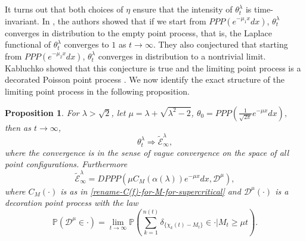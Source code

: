 \documentclass[a4paper,reqno]{amsart}%
\newcommand{\1}{\mathbf 1}
\theoremstyle{mine}
\numberwithin{theorem}{section}
\newtheorem{proposition}[theorem]{Proposition}
\numberwithin{equation}{section}
\theoremstyle{remark}
\begin{document}
It turns out that both choices of $\eta$ ensure that the intensity of $\theta^\lambda_t$ is time-invariant.
 In \cite{Lalley_Sellke}, the authors showed that if we start from $PPP(e^{-\mu_{1}x}dx)$, $\theta^\lambda_{t}$ converges in distribution to the empty point process, that is, the Laplace functional of $\theta^\lambda_{t}$ converges to $1$ as $t \to \infty$. 
 They also conjectured that starting from $PPP(e^{-\mu_{2}x}dx)$, $\theta^\lambda_{t}$ converges in distribution to a nontrivial limit.
 Kabluchko showed that this conjecture is true and the limiting point process is a decorated Poisson point process \cite{Kabluchko}. 
We now identify the exact structure of the limiting point process in the following proposition.
\begin{proposition}\label{Identify_DPPP}
  For $\lambda> \sqrt{2}$, let $\mu = \lambda+\sqrt{\lambda^{2}-2}$, $\theta_0= PPP(\frac{1}{\sqrt{2\pi}}e^{-\mu x}dx),$ then as $t \to \infty$,
\begin{equation}
  \theta_{t}^{\lambda} \Rightarrow \widetilde{\mathcal E}_{\infty}^\lambda,
\end{equation}
where the convergence is in the sense of vague convergence on the space of all point configurations. Furthermore 
\begin{equation}\label{Def_fixed}
 \widetilde{\mathcal E}_{\infty}^\lambda = DPPP(\mu C_M(\alpha(\lambda))e^{-\mu x}dx,\mathcal{D}^{\mu}),
\end{equation}
 where $C_M(\cdot)$ is as in \eqref{rename-C(f)-for-M-for-supercritical} and
$\mathcal D^{\mu}(\cdot)$ is a decoration point process with the law
\begin{equation}
     \mathbb P(\mathcal{D}^{\mu} \in \cdot) = \lim_{t\to\infty}\mathbb P(\sum_{k = 1}^{n(t)}\delta_{\{\chi_{k}(t) - M_{t} \}} \in \cdot | M_{t} \ge \mu t).
\end{equation}
\end{proposition}
\end{document}
